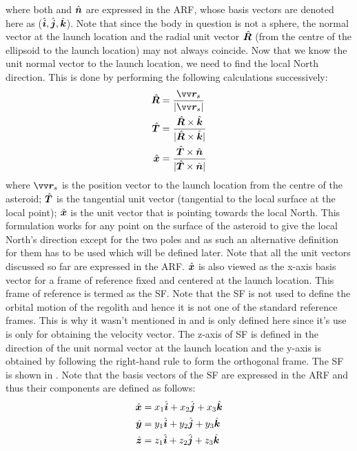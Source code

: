 where both  and $\hat{\bm{n}}$ are expressed in the \gls{ARF}, whose basis vectors are denoted here as ($\hat{\bm{i}},\hat{\bm{j}},\hat{\bm{k}}$). Note that since the body in question is not a sphere, the normal vector at the launch location and the radial unit vector $\hat{\bm{R}}$ (from the centre of the ellipsoid to the launch location) may not always coincide. Now that we know the unit normal vector to the launch location, we need to find the local North direction. This is done by performing the following calculations successively:
\begin{align}
    \buv{R} &= \frac{\bv{r}_s}{|\bv{r}_s|} \\
    \buv{T} &= \frac{\buv{R} \times \buv{k}}{|\buv{R} \times \buv{k}|} \\
    \buv{x} &= \frac{\buv{T} \times \buv{n}}{|\buv{T} \times \buv{n}|} \\
    \label{eqn:surface_frame_xBasis}
\end{align}
where $\bv{r}_s$ is the position vector to the launch location from the centre of the asteroid; $\hat{\bm{T}}$ is the tangential unit vector (tangential to the local surface at the local point); $\hat{\bm{x}}$ is the unit vector that is pointing towards the local North. This formulation works for any point on the surface of the asteroid to give the local North's direction except for the two poles and as such an alternative definition for them has to be used which will be defined later. Note that all the unit vectors discussed so far are expressed in the \gls{ARF}.
%
\newline\newline
%
$\hat{\bm{x}}$ is also viewed as the x-axis basis vector for a frame of reference fixed and centered at the launch location. This frame of reference is termed as the \gls{SF}. Note that the \gls{SF} is not used to define the orbital motion of the regolith and hence it is not one of the standard reference frames. This is why it wasn't mentioned in  and is only defined here since it's use is only for obtaining the velocity vector. The z-axis of \gls{SF} is defined in the direction of the unit normal vector at the launch location and the y-axis is obtained by following the right-hand rule to form the orthogonal frame. The \gls{SF} is shown in .
%
\newline\newline
%
Note that the basis vectors of the \gls{SF} are expressed in the \gls{ARF} and thus their components are defined as follows:
\begin{align}
    \hat{\bm{x}} &= x_1\hat{\bm{i}} + x_2\hat{\bm{j}} + x_3\hat{\bm{k}}
    \label{eqn:sf_xbasis_exp} \\
    \hat{\bm{y}} &= y_1\hat{\bm{i}} + y_2\hat{\bm{j}} + y_3\hat{\bm{k}}
    \label{eqn:sf_ybasis_exp} \\
    \hat{\bm{z}} &= z_1\hat{\bm{i}} + z_2\hat{\bm{j}} + z_3\hat{\bm{k}}
    \label{eqn:sf_zbasis_exp}
\end{align}
